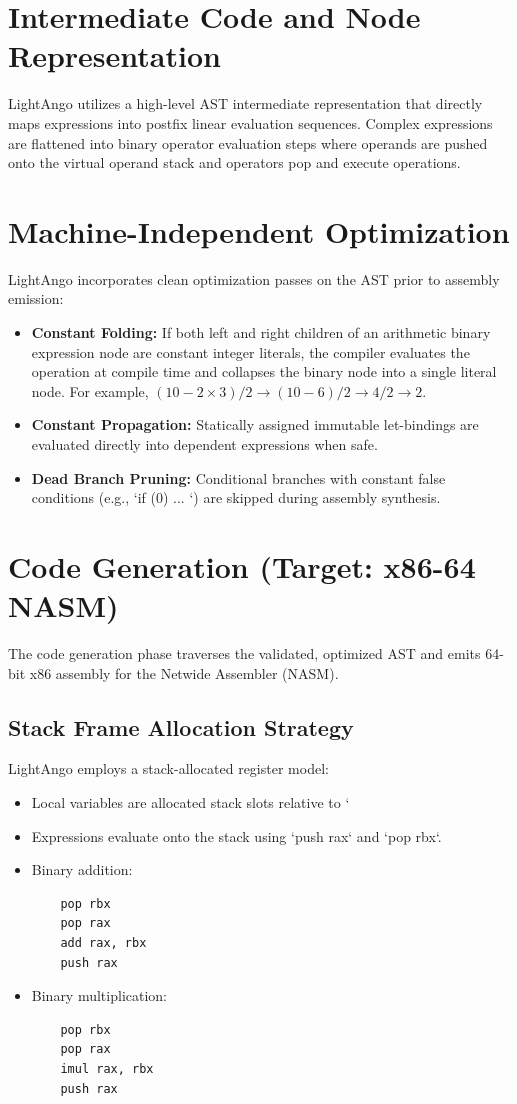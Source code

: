 \section{Intermediate Code and Node Representation}
LightAngo utilizes a high-level AST intermediate representation that directly maps expressions into postfix linear evaluation sequences. Complex expressions are flattened into binary operator evaluation steps where operands are pushed onto the virtual operand stack and operators pop and execute operations.

\section{Machine-Independent Optimization}
LightAngo incorporates clean optimization passes on the AST prior to assembly emission:
\begin{itemize}
    \item \textbf{Constant Folding:} If both left and right children of an arithmetic binary expression node are constant integer literals, the compiler evaluates the operation at compile time and collapses the binary node into a single literal node. For example, $(10 - 2 \times 3) / 2 \rightarrow (10 - 6)/2 \rightarrow 4/2 \rightarrow 2$.
    \item \textbf{Constant Propagation:} Statically assigned immutable let-bindings are evaluated directly into dependent expressions when safe.
    \item \textbf{Dead Branch Pruning:} Conditional branches with constant false conditions (e.g., `if (0) { ... }`) are skipped during assembly synthesis.
\end{itemize}

\section{Code Generation (Target: x86-64 NASM)}
The code generation phase traverses the validated, optimized AST and emits 64-bit x86 assembly for the Netwide Assembler (NASM).

\subsection{Stack Frame Allocation Strategy}
LightAngo employs a stack-allocated register model:
\begin{itemize}
    \item Local variables are allocated stack slots relative to `%
    \item Expressions evaluate onto the stack using `push rax` and `pop rbx`.
    \item Binary addition:
    \begin{verbatim}
    pop rbx
    pop rax
    add rax, rbx
    push rax
    \end{verbatim}
    \item Binary multiplication:
    \begin{verbatim}
    pop rbx
    pop rax
    imul rax, rbx
    push rax
    \end{verbatim}
\end{itemize}

